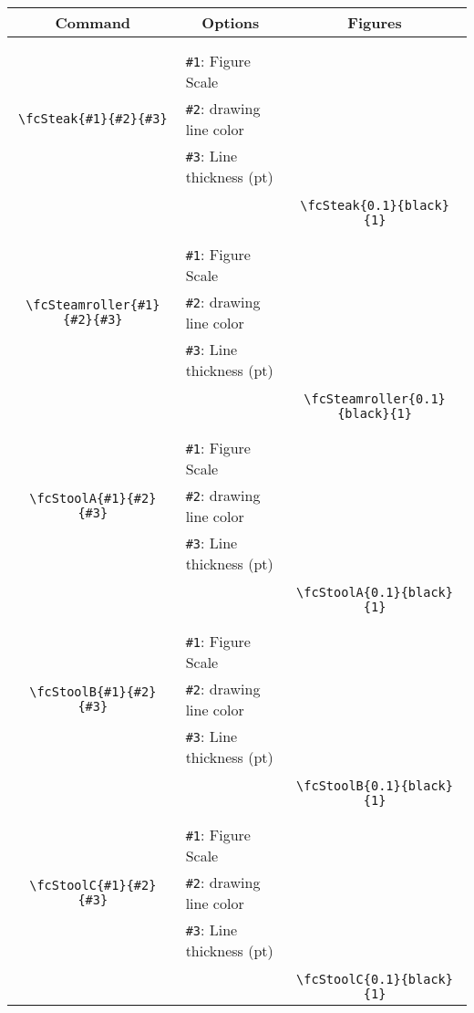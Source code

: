 \documentclass[x11names]{article}
\begin{document}
\begin{table}[H]\centering\begin{tabular}{|c|l|c|}\hline {\bf Command}& \multicolumn{1}{c|}{{\bf Options}} & {\bf Figures}\\  \hline	&&\multirow{5}{*}{\fcSteak{0.1}{black}{1}}\\	&&\\	&\verb|#1|: Figure Scale &\\	\verb|\fcSteak{#1}{#2}{#3}|&	\verb|#2|: drawing line color &\\	&\verb|#3|: Line thickness (pt) &\\ &&\\&&	\verb|\fcSteak{0.1}{black}{1}|\\\hline 	
	&&\multirow{5}{*}{\fcSteamroller{0.1}{black}{1}}\\	&&\\	&\verb|#1|: Figure Scale &\\	\verb|\fcSteamroller{#1}{#2}{#3}|&	\verb|#2|: drawing line color &\\	&\verb|#3|: Line thickness (pt) &\\ &&\\&&	\verb|\fcSteamroller{0.1}{black}{1}|\\\hline 	
	&&\multirow{5}{*}{\fcStoolA{0.1}{black}{1}}\\	&&\\	&\verb|#1|: Figure Scale &\\	\verb|\fcStoolA{#1}{#2}{#3}|&	\verb|#2|: drawing line color &\\	&\verb|#3|: Line thickness (pt) &\\ &&\\&&	\verb|\fcStoolA{0.1}{black}{1}|\\\hline 	
	&&\multirow{5}{*}{\fcStoolB{0.1}{black}{1}}\\	&&\\	&\verb|#1|: Figure Scale &\\	\verb|\fcStoolB{#1}{#2}{#3}|&	\verb|#2|: drawing line color &\\	&\verb|#3|: Line thickness (pt) &\\ &&\\&&	\verb|\fcStoolB{0.1}{black}{1}|\\\hline 	
	&&\multirow{5}{*}{\fcStoolC{0.1}{black}{1}}\\	&&\\	&\verb|#1|: Figure Scale &\\	\verb|\fcStoolC{#1}{#2}{#3}|&	\verb|#2|: drawing line color &\\	&\verb|#3|: Line thickness (pt) &\\ &&\\&&	\verb|\fcStoolC{0.1}{black}{1}|\\\hline 	

\end{tabular}
\end{table}
\end{document}
